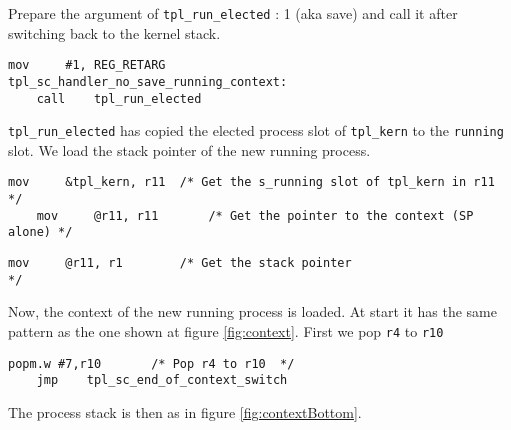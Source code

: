 \documentclass[11pt, oneside]{article}   	%
\begin{document}
Prepare the argument of \lstinline{tpl_run_elected} : 1 (aka save) and call it after switching back to the kernel stack.

\begin{lstlisting}[backgroundcolor=\color{red!15}]
    mov     #1, REG_RETARG
tpl_sc_handler_no_save_running_context:
    call    tpl_run_elected
\end{lstlisting}

\lstinline{tpl_run_elected} has copied the elected process slot of \lstinline{tpl_kern} to the \lstinline{running} slot. We load the stack pointer of the new running process.

\begin{lstlisting}[backgroundcolor=\color{red!15}]
    mov     &tpl_kern, r11  /* Get the s_running slot of tpl_kern in r11 */
    mov     @r11, r11       /* Get the pointer to the context (SP alone) */
\end{lstlisting}
\begin{lstlisting}[backgroundcolor=\color{yellow!15}]
    mov     @r11, r1        /* Get the stack pointer                     */
\end{lstlisting}

Now, the context of the new running process is loaded. At start it has the same pattern as the one shown at figure \ref{fig:context}. First we pop \lstinline{r4} to \lstinline{r10}

\begin{lstlisting}[backgroundcolor=\color{yellow!15}]
    popm.w #7,r10       /* Pop r4 to r10  */
    jmp    tpl_sc_end_of_context_switch
\end{lstlisting}

The process stack is then as in figure \ref{fig:contextBottom}.
\end{document}
